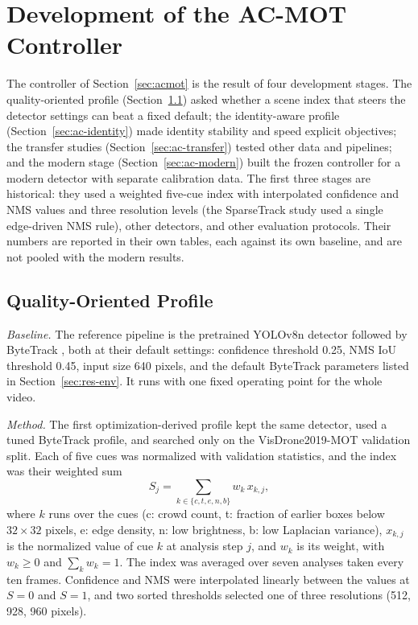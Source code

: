 \section{Development of the AC-MOT Controller}\label{sec:ac-dev}
The controller of Section~\ref{sec:acmot} is the result of four development stages. The quality-oriented profile (Section~\ref{sec:ac-quality}) asked whether a scene index that steers the detector settings can beat a fixed default; the identity-aware profile (Section~\ref{sec:ac-identity}) made identity stability and speed explicit objectives; the transfer studies (Section~\ref{sec:ac-transfer}) tested other data and pipelines; and the modern stage (Section~\ref{sec:ac-modern}) built the frozen controller for a modern detector with separate calibration data. The first three stages are historical: they used a weighted five-cue index with interpolated confidence and NMS values and three resolution levels (the SparseTrack study used a single edge-driven NMS rule), other detectors, and other evaluation protocols. Their numbers are reported in their own tables, each against its own baseline, and are not pooled with the modern results.

\subsection{Quality-Oriented Profile}\label{sec:ac-quality}
\emph{Baseline.} The reference pipeline is the pretrained YOLOv8n detector \cite{jocher2023yolov8} followed by ByteTrack \cite{zhang2022bytetrack}, both at their default settings: confidence threshold 0.25, NMS IoU threshold 0.45, input size 640 pixels, and the default ByteTrack parameters listed in Section~\ref{sec:res-env}. It runs with one fixed operating point for the whole video.

\emph{Method.} The first optimization-derived profile kept the same detector, used a tuned ByteTrack profile, and searched only on the VisDrone2019-MOT validation split. Each of five cues was normalized with validation statistics, and the index was their weighted sum
\begin{equation}
S_j=\sum_{k\in\{c,t,e,n,b\}}w_k\,x_{k,j},
\label{eq:ac-histsci}
\end{equation}
where $k$ runs over the cues (c: crowd count, t: fraction of earlier boxes below $32\times32$ pixels, e: edge density, n: low brightness, b: low Laplacian variance), $x_{k,j}$ is the normalized value of cue $k$ at analysis step $j$, and $w_k$ is its weight, with $w_k\geq0$ and $\sum_k w_k=1$. The index was averaged over seven analyses taken every ten frames. Confidence and NMS were interpolated linearly between the values at $S=0$ and $S=1$, and two sorted thresholds selected one of three resolutions (512, 928, 960 pixels).

